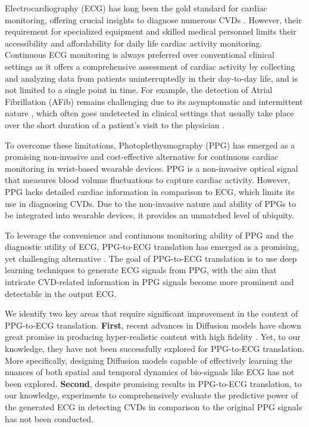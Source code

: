 \documentclass[letterpaper]{article} %
\begin{document}
Electrocardiography (ECG) has long been the gold standard for cardiac monitoring, offering crucial insights to diagnose numerous CVDs \cite{hannun2019cardiologist}. However, their requirement for specialized equipment and skilled medical personnel limits their accessibility and affordability for daily life cardiac activity monitoring. Continuous ECG monitoring is always preferred over conventional clinical settings as it offers a comprehensive assessment of cardiac activity by collecting and analyzing data from patients uninterruptedly in their day-to-day life, and is not limited to a single point in time. For example, the detection of Atrial Fibrillation (AFib) remains challenging due to its asymptomatic and intermittent nature \cite{camm2012usefulness}, which often goes undetected in clinical settings that usually take place over the short duration of a patient's visit to the physician \cite{steinhubl2018effect}. 

To overcome these limitations, Photoplethysmography (PPG) has emerged as a promising non-invasive and cost-effective alternative for continuous cardiac monitoring in wrist-based wearable devices.
PPG is a non-invasive optical signal that measures blood volume fluctuations to capture cardiac activity. However, PPG lacks detailed cardiac information in comparison to ECG, which limits its use in diagnosing CVDs. Due to the non-invasive nature and ability of PPGs to be integrated into wearable devices, it provides an unmatched level of ubiquity. 

To leverage the convenience and continuous monitoring ability of PPG and the diagnostic utility of ECG, PPG-to-ECG translation has emerged as a promising, yet challenging alternative \cite{sarkar2021cardiogan,vo2021p2e,lan2023performer}. The goal of PPG-to-ECG translation is to use deep learning techniques to generate ECG signals from PPG, with the aim that intricate %
CVD-related information in PPG signals become more prominent and detectable in the output ECG.


We identify two key areas that require significant improvement in the context of PPG-to-ECG translation. 
\textbf{First}, recent advances in Diffusion models have shown great promise in producing hyper-realistic content with high fidelity \cite{saharia2022photorealistic, blattmann2023align, ruan2023mm}. Yet, to our knowledge, they have not been successfully explored for PPG-to-ECG translation. More specifically, designing Diffusion models capable of effectively learning the nuances of both spatial and temporal dynamics of bio-signals like ECG has not been explored.
\textbf{Second}, despite promising results in PPG-to-ECG translation, to our knowledge, experiments to comprehensively evaluate the predictive power of the generated ECG in detecting CVDs in comparison to the original PPG signals has not been conducted. 
\end{document}
